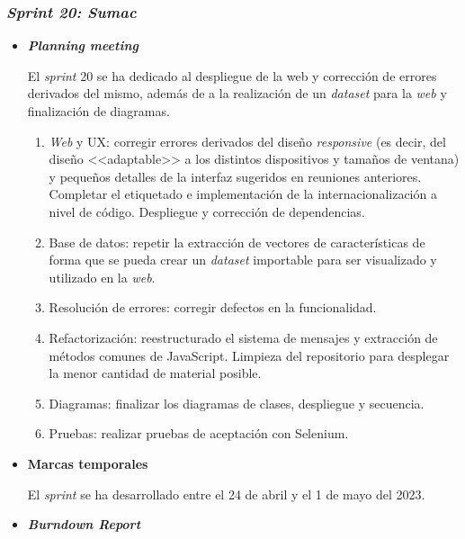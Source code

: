 \subsubsection{\textit{Sprint 20: Sumac}}
\begin{itemize}
	\item \textbf{\textit{Planning meeting}}
	
	El \textit{sprint} 20 se ha dedicado al despliegue de la web y corrección de errores derivados del mismo, además de a la realización de un \textit{dataset} para la \textit{web} y finalización de diagramas.
	
	\begin{enumerate}
		\item \textit{Web} y UX: corregir errores derivados del diseño \textit{responsive} (es decir, del diseño <<adaptable>> a los distintos dispositivos y tamaños de ventana) y pequeños detalles de la interfaz sugeridos en reuniones anteriores. Completar el etiquetado e implementación de la internacionalización a nivel de código. Despliegue y corrección de dependencias.
		\item Base de datos: repetir la extracción de vectores de características de forma que se pueda crear un \textit{dataset} importable para ser visualizado y utilizado en la \textit{web}.
		\item Resolución de errores: corregir defectos en la funcionalidad.
		\item Refactorización: reestructurado el sistema de mensajes y extracción de métodos comunes de JavaScript. Limpieza del repositorio para desplegar la menor cantidad de material posible.
		\item Diagramas: finalizar los diagramas de clases, despliegue y secuencia.
		\item Pruebas: realizar pruebas de aceptación con Selenium.
		
	\end{enumerate}
	\item \textbf{Marcas temporales}		
	
	El \textit{sprint} se ha desarrollado entre el 24 de abril y el 1 de mayo del 2023.
	
	\item \textbf{\textit{Burndown Report}}
	

\end{itemize}
